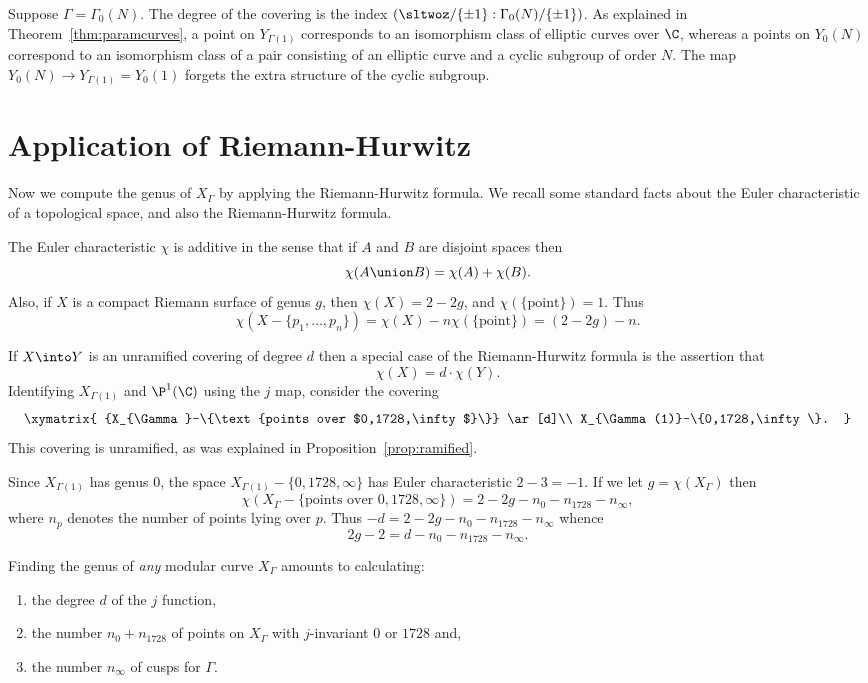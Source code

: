 \documentclass{report}
\begin{document}
\begin{example} Suppose $\Gamma=\Gamma_0(N)$. The degree of the
  covering is the index $(\sltwoz/\{\pm 1\}:\Gamma_0(N)/\{\pm 1\})$.
  As explained in Theorem~\ref{thm:paramcurves}, a point on
  $Y_{\Gamma(1)}$ corresponds to an isomorphism class of elliptic
  curves over $\C$, whereas a points on $Y_{0}(N)$ correspond to an
  isomorphism class of a pair consisting of an elliptic curve and a
  cyclic subgroup of order $N$.  The map $Y_0(N)\to
  Y_{\Gamma(1)}=Y_0(1)$ forgets the extra structure of the cyclic
  subgroup.
\end{example}

\section{Application of Riemann-Hurwitz}\label{sec:riemann_gamma}
Now we compute the genus of $X_{\Gamma}$ by applying the
Riemann-Hurwitz formula.
We recall some standard facts
about the Euler characteristic of a topological space, and
also the Riemann-Hurwitz formula.

The Euler characteristic $\chi$ is additive in
the sense that if $A$ and $B$ are disjoint spaces then
$$\chi(A\union B)=\chi(A)+\chi(B).$$
Also, if $X$ is a compact Riemann surface of genus $g$, then
$\chi(X)=2-2g$, and $\chi(\{\text{point}\})=1$.
Thus
$$\chi(X-\{p_1,\ldots,p_n\})=\chi(X)-n\chi(\{\text{point}\})=(2-2g)-n.$$

If $X\into Y$ is an unramified covering
of degree $d$ then a special case of
the Riemann-Hurwitz formula is the assertion that
\begin{equation}
\chi(X)=d\cdot\chi(Y).
\end{equation}
Identifying $X_{\Gamma(1)}$ and $\P^1(\C)$ using the $j$ map,
consider the covering
$$\xymatrix{
  {X_{\Gamma}-\{\text{points over $0,1728,\infty$}\}}
     \ar[d]\\
  X_{\Gamma(1)}-\{0,1728,\infty\}.
}$$
This covering is unramified, as was explained in Proposition~\ref{prop:ramified}.

Since $X_{\Gamma(1)}$ has genus $0$, the space $X_{\Gamma(1)}-\{0,1728,\infty\}$
has Euler characteristic $2-3=-1$. If we let $g=\chi(X_{\Gamma})$ then
$$\chi(X_{\Gamma}-\{\text{points over $0,1728,\infty$}\})
             = 2-2g -n_{0} - n_{1728} - n_{\infty},$$
where $n_p$ denotes the number of points lying over $p$.
Thus $-d=2-2g-n_0-n_{1728}-n_{\infty}$ whence
$$2g-2 = d - n_0 -n_{1728}-n_{\infty}.$$

 Finding the genus of {\em any} modular curve $X_{\Gamma}$
amounts to calculating:
\begin{enumerate}\setlength{\itemsep}{-.5ex}
\item the degree $d$ of the $j$ function,
\item the
number $n_0 + n_{1728}$ of points on $X_{\Gamma}$ with $j$-invariant $0$ or $1728$
and,
\item the number $n_{\infty}$ of cusps for $\Gamma$.
\end{enumerate}
\end{document}
